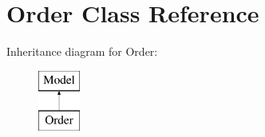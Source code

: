 \hypertarget{classapp_1_1models_1_1_order}{}\section{Order Class Reference}
\label{classapp_1_1models_1_1_order}
Inheritance diagram for Order\+:\begin{figure}[H]
\begin{center}
\leavevmode
\includegraphics[height=2.000000cm]{classapp_1_1models_1_1_order}
\end{center}
\end{figure}
